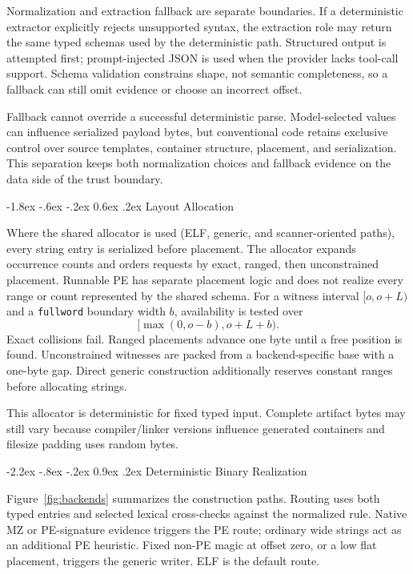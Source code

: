 \documentclass[11pt,twocolumn]{article}
\makeatletter
\newcommand{\code}[1]{\texttt{#1}}
\renewcommand\section{\@startsection{section}{1}{\z@}%
  {-2.2ex \@plus -.8ex \@minus -.2ex}%
  {0.9ex \@plus .2ex}%
  {\normalfont\large\bfseries}}
\renewcommand\subsection{\@startsection{subsection}{2}{\z@}%
  {-1.8ex \@plus -.6ex \@minus -.2ex}%
  {0.6ex \@plus .2ex}%
  {\normalfont\normalsize\bfseries}}
\makeatother
\begin{document}
Normalization and extraction fallback are separate boundaries. If a
deterministic extractor explicitly rejects unsupported syntax, the extraction
role may return the same typed schemas used by the deterministic path. Structured
output is attempted first; prompt-injected JSON is used when the provider lacks
tool-call support. Schema validation constrains shape, not semantic completeness,
so a fallback can still omit evidence or choose an incorrect offset.

Fallback cannot override a successful deterministic parse. Model-selected values
can influence serialized payload bytes, but conventional code retains exclusive
control over source templates, container structure, placement, and serialization.
This separation keeps both normalization choices and fallback evidence on the
data side of the trust boundary.

\subsection{Layout Allocation}

Where the shared allocator is used (ELF, generic, and scanner-oriented paths),
every string entry is serialized before placement. The allocator expands
occurrence counts and orders requests by exact, ranged, then unconstrained
placement. Runnable PE has separate placement logic and does not realize every
range or count represented by the shared schema. For a witness interval
$[o,o+L)$ and a \code{fullword} boundary width $b$, availability is tested over
\begin{equation}
  [\max(0,o-b), o+L+b).
\end{equation}
Exact collisions fail. Ranged placements advance one byte until a free position
is found. Unconstrained witnesses are packed from a backend-specific base with a
one-byte gap. Direct generic construction additionally reserves constant ranges
before allocating strings.

This allocator is deterministic for fixed typed input. Complete artifact bytes
may still vary because compiler/linker versions influence generated containers
and filesize padding uses random bytes.

\section{Deterministic Binary Realization}
\label{sec:realization}

Figure~\ref{fig:backends} summarizes the construction paths. Routing uses both
typed entries and selected lexical cross-checks against the normalized rule.
Native MZ or PE-signature evidence triggers the PE route; ordinary wide strings
act as an additional PE heuristic. Fixed non-PE magic at offset zero, or a low
flat placement, triggers the generic writer. ELF is the default route.
\end{document}
